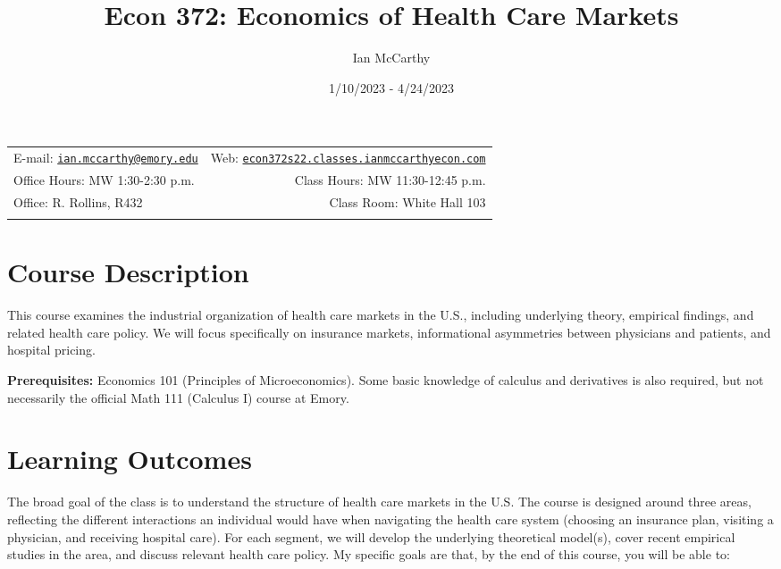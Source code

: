 \documentclass[11pt,]{article}
\title{Econ 372: Economics of Health Care Markets}
\author{Ian McCarthy}
\date{1/10/2023 - 4/24/2023}
\begin{document}
  

		\maketitle
		
	
		\thispagestyle{firststyle}



	\noindent \begin{tabular*}{\textwidth}{ @{\extracolsep{\fill}} lr @{\extracolsep{\fill}}}


E-mail: \texttt{\href{mailto:ian.mccarthy@emory.edu}{\nolinkurl{ian.mccarthy@emory.edu}}} & Web: \href{http://econ372s22.classes.ianmccarthyecon.com}{\tt econ372s22.classes.ianmccarthyecon.com}\\
Office Hours: MW 1:30-2:30 p.m.  &  Class Hours: MW 11:30-12:45 p.m.\\
Office: R. Rollins, R432  & Class Room: White Hall 103\\
	&  \\
	\hline
	\end{tabular*}
	
\vspace{2mm}
	


\hypertarget{course-description}{%
\section{Course Description}\label{course-description}}

This course examines the industrial organization of health care markets
in the U.S., including underlying theory, empirical findings, and
related health care policy. We will focus specifically on insurance
markets, informational asymmetries between physicians and patients, and
hospital pricing.

\textbf{Prerequisites:} Economics 101 (Principles of Microeconomics).
Some basic knowledge of calculus and derivatives is also required, but
not necessarily the official Math 111 (Calculus I) course at Emory.

\hypertarget{learning-outcomes}{%
\section{Learning Outcomes}\label{learning-outcomes}}

The broad goal of the class is to understand the structure of health
care markets in the U.S. The course is designed around three areas,
reflecting the different interactions an individual would have when
navigating the health care system (choosing an insurance plan, visiting
a physician, and receiving hospital care). For each segment, we will
develop the underlying theoretical model(s), cover recent empirical
studies in the area, and discuss relevant health care policy. My
specific goals are that, by the end of this course, you will be able to:
\end{document}
